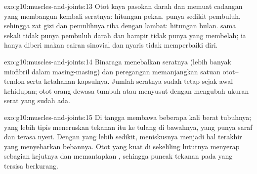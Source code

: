 \begin{solution}{exo:g10:muscles-and-joints:13}
Otot kaya pasokan darah dan memuat  cadangan yang membangun kembali
seratnya: hitungan pekan.  punya sedikit pembuluh, sehingga zat
gizi dan  pemulihnya tiba dengan lambat: hitungan bulan.  sama sekali tidak punya pembuluh darah dan hampir tidak punya 
yang membelah; ia hanya diberi makan cairan sinovial dan nyaris tidak
memperbaiki diri.
\end{solution}

\begin{solution}{exo:g10:muscles-and-joints:14}
Binaraga menebalkan seratnya (lebih banyak miofibril dalam
masing-masing) dan peregangan memanjangkan satuan otot--tendon serta
ketahanan kapsulnya. Jumlah seratnya sudah tetap sejak awal kehidupan;
otot orang dewasa tumbuh atau menyusut dengan mengubah ukuran serat
yang sudah ada.
\end{solution}

\begin{solution}{exo:g10:muscles-and-joints:15}
Di tangga  membawa beberapa kali berat tubuhnya; 
yang lebih tipis meneruskan tekanan itu ke tulang di bawahnya, yang
punya saraf dan terasa nyeri. Dengan  yang lebih sedikit,
meniskusnya menjadi hal terakhir yang menyebarkan bebannya. Otot yang
kuat di sekeliling lututnya menyerap sebagian kejutnya dan memantapkan
, sehingga puncak tekanan pada  yang tersisa berkurang.
\end{solution}

